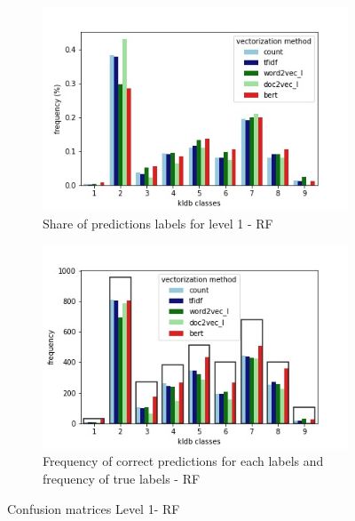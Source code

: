 \documentclass[12pt, a4paper, titlepage]{article}
\begin{document}
\begin{figure}
  \centering
  \begin{subfigure}[b]{0.475\textwidth}
      \centering
      \includegraphics[width=\textwidth]{predictions_RF.jpg}
      {{\small Share of predictions labels for level 1 - \ac{RF}}
      }    
  \end{subfigure}
  \hfill
  \begin{subfigure}[b]{0.475\textwidth}  
      \centering 
      \includegraphics[width=\textwidth]{predictions_correct_relative_RF.jpg}
      {{\small Frequency of correct predictions for each labels and frequency of true labels - \ac{RF}}}    
  \end{subfigure}
\caption{\label{fig: F18} Confusion matrices Level 1- \ac{RF}}
\end{figure}
\end{document}
